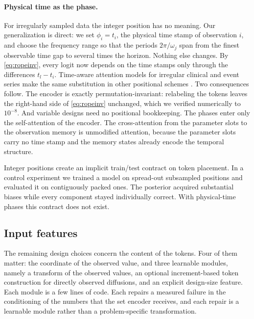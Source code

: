 \documentclass[10pt]{article}
\begin{document}
\paragraph{Physical time as the phase.} For irregularly sampled data the integer position has no
meaning. Our generalization is direct: we set $\phi_i = t_i$, the physical time stamp of observation
$i$, and choose the frequency range so that the periods $2\pi/\omega_j$ span from the finest
observable time gap to several times the horizon. Nothing else changes. By \eqref{eq:ropeinv}, every
logit now depends on the time stamps only through the differences $t_l - t_i$. Time-aware attention
models for irregular clinical and event series make the same substitution in other positional schemes
\citep{horn2020, shukla2021}. Two consequences follow. The encoder is exactly permutation-invariant:
relabeling the tokens leaves the right-hand side of \eqref{eq:ropeinv} unchanged, which we verified
numerically to $10^{-8}$. And variable designs need no positional bookkeeping. The phases enter only
the self-attention of the encoder. The cross-attention from the parameter slots to the observation
memory is unmodified attention, because the parameter slots carry no time stamp and the memory states
already encode the temporal structure.

Integer positions create an implicit train/test contract on token placement. In a control experiment
we trained a model on spread-out subsampled positions and evaluated it on contiguously packed ones.
The posterior acquired substantial biases while every component stayed individually correct. With
physical-time phases this contract does not exist.

\subsection{Input features}
\label{sec:features}

The remaining design choices concern the content of the tokens. Four of them matter: the coordinate of
the observed value, and three learnable modules, namely a transform of the observed values, an
optional increment-based token construction for directly observed diffusions, and an explicit
design-size feature. Each module is a few lines of code. Each repairs a measured failure in the
conditioning of the numbers that the set encoder receives, and each repair is a learnable module
rather than a problem-specific transformation.
\end{document}
